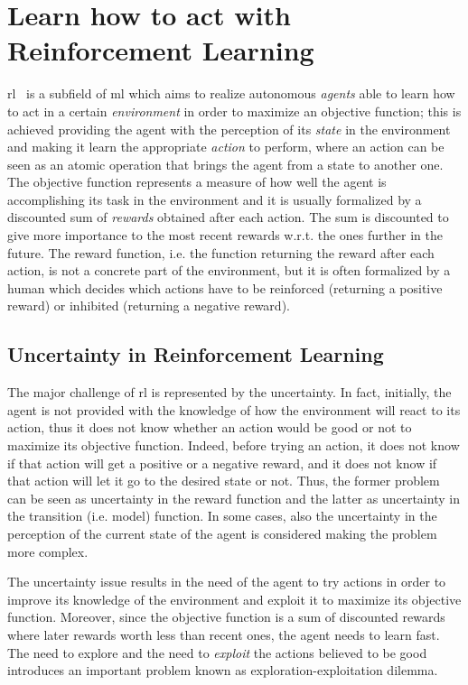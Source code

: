 \section{Learn how to act with Reinforcement Learning}
\gls{rl}~\cite{sutton1998reinforcement} is a subfield of \gls{ml} which aims to realize autonomous \textit{agents} able to learn how to act in a certain \textit{environment} in order to maximize an objective function; this is achieved providing the agent with the perception of its \textit{state} in the environment and making it learn the appropriate \textit{action} to perform, where an action can be seen as an atomic operation that brings the agent from a state to another one. The objective function represents a measure of how well the agent is accomplishing its task in the environment and it is usually formalized by a discounted sum of \textit{rewards} obtained after each action. The sum is discounted to give more importance to the most recent rewards w.r.t. the ones further in the future. The reward function, i.e. the function returning the reward after each action, is not a concrete part of the environment, but it is often formalized by a human which decides which actions have to be reinforced (returning a positive reward) or inhibited (returning a negative reward). 

\subsection{Uncertainty in Reinforcement Learning}
The major challenge of \gls{rl} is represented by the uncertainty. In fact, initially, the agent is not provided with the knowledge of how the environment will react to its action, thus it does not know whether an action would be good or not to maximize its objective function. Indeed, before trying an action, it does not know if that action will get a positive or a negative reward, and it does not know if that action will let it go to the desired state or not. Thus, the former problem can be seen as uncertainty in the reward function and the latter as uncertainty in the transition (i.e. model) function. In some cases, also the uncertainty in the perception of the current state of the agent is considered making the problem more complex.

The uncertainty issue results in the need of the agent to try actions in order to improve its knowledge of the environment and exploit it to maximize its objective function. Moreover, since the objective function is a sum of discounted rewards where later rewards worth less than recent ones, the agent needs to learn fast. The need to explore and the need to \textit{exploit} the actions believed to be good introduces an important problem known as exploration-exploitation dilemma.
